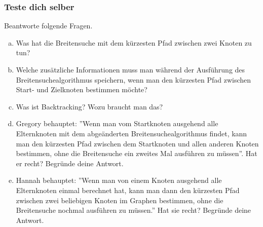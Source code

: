 \subsubsection*{\textcolor{blue-violet}{Teste dich selber}}
\begin{aufgabe}\label{pfad_kontrollfragen}
Beantworte folgende Fragen.
\begin{enumerate}[(a)]
\item Was hat die Breitensuche mit dem kürzesten Pfad zwischen zwei Knoten zu tun?
\item Welche zusätzliche Informationen muss man während der Ausführung des Breitensuchealgorithmus speichern, wenn man den kürzesten Pfad zwischen Start- und Zielknoten bestimmen möchte?
\item Was ist Backtracking? Wozu braucht man das?
\item Gregory behauptet: ''Wenn man vom Startknoten ausgehend alle Elternknoten mit dem abgeänderten Breitensuchealgorithmus findet, kann man den kürzesten Pfad zwischen dem Startknoten und allen anderen Knoten bestimmen, ohne die Breitensuche ein zweites Mal ausführen zu müssen''. Hat er recht? Begründe deine Antwort.
\item Hannah behauptet: ''Wenn man von einem Knoten ausgehend alle Elternknoten einmal berechnet hat, kann man dann den kürzesten Pfad zwischen zwei beliebigen Knoten im Graphen bestimmen, ohne die Breitensuche nochmal ausführen zu müssen.'' Hat sie recht? Begründe deine Antwort.
\end{enumerate}
\end{aufgabe}

